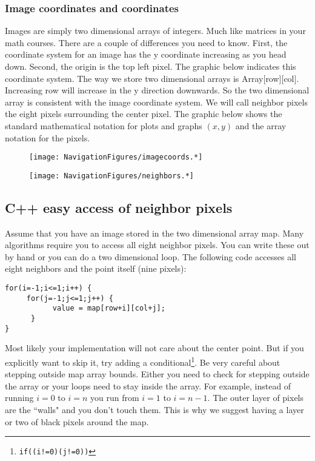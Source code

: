 \hypertarget{image-coordinates-and-coordinates}{%
\subsubsection{Image coordinates and
coordinates}\label{image-coordinates-and-coordinates}}

Images are simply two dimensional arrays of integers. Much like matrices
in your math courses. There are a couple of differences you need to
know. First, the coordinate system for an image has the y coordinate
increasing as you head down. Second, the origin is the top left pixel.
The graphic below indicates this coordinate system. The way we store two
dimensional arrays is Array{[}row{]}{[}col{]}. Increasing row will
increase in the y direction downwards. So the two dimensional array is
consistent with the image coordinate system. We will call neighbor
pixels the eight pixels surrounding the center pixel. The graphic below
shows the standard mathematical notation for plots and graphs \((x,y)\)
and the array notation for the pixels.

\begin{figure}
\centering
\texttt{[image: NavigationFigures/imagecoords.*]}
\caption{}
\end{figure}

\begin{figure}
\centering
\texttt{[image: NavigationFigures/neighbors.*]}
\caption{}
\end{figure}

\hypertarget{c-easy-access-of-neighbor-pixels}{%
\subsection{C++ easy access of neighbor
pixels}\label{c-easy-access-of-neighbor-pixels}}

Assume that you have an image stored in the two dimensional array map.
Many algorithms require you to access all eight neighbor pixels. You can
write these out by hand or you can do a two dimensional loop. The
following code accesses all eight neighbors and the point itself (nine
pixels):

\begin{verbatim}
for(i=-1;i<=1;i++) {
     for(j=-1;j<=1;j++) {
           value = map[row+i][col+j];
      }
}
\end{verbatim}

Most likely your implementation will not care about the center point.
But if you explicitly want to skip it, try adding a
conditional\footnote{\texttt{if((i!=0)\textbar{}\textbar{}(j!=0))}}. Be
very careful about stepping outside map array bounds. Either you need to
check for stepping outside the array or your loops need to stay inside
the array. For example, instead of running \(i=0\) to \(i=n\) you run
from \(i=1\) to \(i=n-1\). The outer layer of pixels are the ``walls"
and you don't touch them. This is why we suggest having a layer or two
of black pixels around the map.

